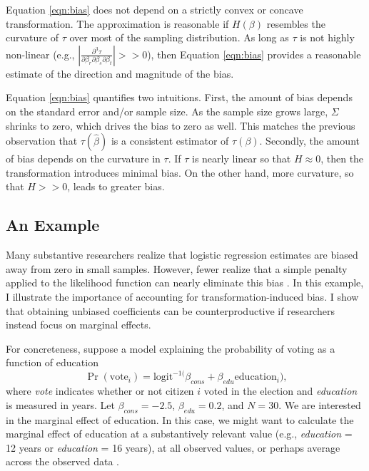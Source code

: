 \documentclass[12pt]{article}
\begin{document}
Equation \ref{eqn:bias} does not depend on a strictly convex or concave transformation. 
The approximation is reasonable if $H(\beta)$ resembles the curvature of $\tau$ over most of the sampling distribution. 
As long as $\tau$ is not highly non-linear (e.g., $\left|\frac{\partial^3 \tau}{\partial \beta_r \partial \beta_s \partial \beta_t}\right| >> 0$), then Equation \ref{eqn:bias} provides a reasonable estimate of the direction and magnitude of the bias.

Equation \ref{eqn:bias} quantifies two intuitions. 
First, the amount of bias depends on the standard error and/or sample size. 
As the sample size grows large, $\Sigma$ shrinks to zero, which drives the bias to zero as well. 
This matches the previous observation that $\tau(\hat{\beta})$ is a consistent estimator of $\tau(\beta)$. 
Secondly, the amount of bias depends on the curvature in $\tau$. 
If $\tau$ is nearly linear so that $H \approx 0$, then the transformation introduces minimal bias. 
On the other hand, more curvature, so that $H >> 0$, leads to greater bias. 

\subsection*{An Example}

Many substantive researchers realize that logistic regression estimates are biased away from zero in small samples. 
However, fewer realize that a simple penalty applied to the likelihood function can nearly eliminate this bias \citep{Firth1993}. 
In this example, I illustrate the importance of accounting for transformation-induced bias. 
I show that obtaining unbiased coefficients can be counterproductive if researchers instead focus on marginal effects.

For concreteness, suppose a model explaining the probability of voting as a function of education
\begin{equation}
\Pr (\text{vote}_i) = \text{logit}^{-1(}\beta_{cons} + \beta_{edu} \text{education}_i) \text{,}\nonumber
\end{equation}
where \textit{vote} indicates whether or not citizen $i$ voted in the election and \textit{education} is measured in years. 
Let $\beta_{cons} = -2.5$, $\beta_{edu} = 0.2$, and $N = 30$. 
We are interested in the marginal effect of education. 
In this case, we might want to calculate the marginal effect of education at a substantively relevant value (e.g., \textit{education} = 12 years or \textit{education} = 16 years), at all observed values, or perhaps average across the observed data \citep{HanmerKalkan2013}.
\end{document}
